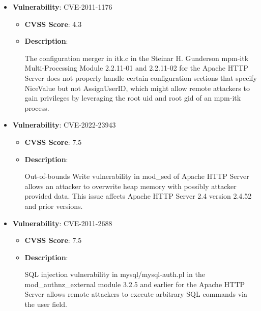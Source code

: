 \documentclass{article}
\begin{document}
\begin{itemize}
        \item \textbf{Vulnerability}: CVE-2011-1176
        \begin{itemize}
            \item \textbf{CVSS Score}:  4.3 
            \item \textbf{Description}:
            \parbox[t]{0.9\linewidth}{
                \ttfamily The configuration merger in itk.c in the Steinar H. Gunderson mpm-itk Multi-Processing Module 2.2.11-01 and 2.2.11-02 for the Apache HTTP Server does not properly handle certain configuration sections that specify NiceValue but not AssignUserID, which might allow remote attackers to gain privileges by leveraging the root uid and root gid of an mpm-itk process.
            }
        \end{itemize}
    
        \item \textbf{Vulnerability}: CVE-2022-23943
        \begin{itemize}
            \item \textbf{CVSS Score}:  7.5 
            \item \textbf{Description}:
            \parbox[t]{0.9\linewidth}{
                \ttfamily Out-of-bounds Write vulnerability in mod\_sed of Apache HTTP Server allows an attacker to overwrite heap memory with possibly attacker provided data. This issue affects Apache HTTP Server 2.4 version 2.4.52 and prior versions.
            }
        \end{itemize}
    
        \item \textbf{Vulnerability}: CVE-2011-2688
        \begin{itemize}
            \item \textbf{CVSS Score}:  7.5 
            \item \textbf{Description}:
            \parbox[t]{0.9\linewidth}{
                \ttfamily SQL injection vulnerability in mysql/mysql-auth.pl in the mod\_authnz\_external module 3.2.5 and earlier for the Apache HTTP Server allows remote attackers to execute arbitrary SQL commands via the user field.
            }
        \end{itemize}
    

\end{itemize}
\end{document}
